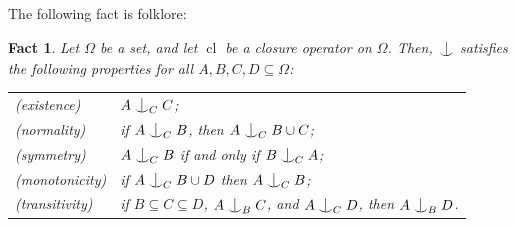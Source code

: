 \documentclass{article}
\newtheorem{lemma}[theorem]{Lemma}
\newtheorem{fact}[theorem]{Fact}
\theoremstyle{remark}
\newtheorem{notation}[theorem]{Notation}
\theoremstyle{definition}
\newtheorem{definition}[theorem]{Definition}
\def\acts{\curvearrowright}
\newcommand{\remmic}[1]{\textcolor{orange}{MP: #1}}
\newcommand{\indep}[2]{%
  \mathrel{
    \mathop{
      \vcenter{
        \hbox{\oalign{\noalign{\kern-.3ex}\hfil$\vert$\rlap{$^\mathrm{#2}$}\hfil\cr
              \noalign{\kern-.7ex}
              $\smile$\cr\noalign{\kern-.3ex}}}
      }
    }\displaylimits_{#1}
  }
}
\DeclareMathOperator{\cl}{cl}
\DeclareMathOperator{\acl}{acl}
\newcommand{\fps}[1]{[#1]^{<\omega}}
\def\Ind#1#2{#1\setbox0=\hbox{$#1x$}\kern\wd0\hbox to 0pt{\hss$#1\mid$\hss}
	\lower.9\ht0\hbox to 0pt{\hss$#1\smile$\hss}\kern\wd0}
\def\ind{\mathop{\mathpalette\Ind{}}}
\begin{document}
{{%



{The following fact is folklore:}

\begin{fact}\label{fact:axioms} 
{Let $\Omega$ be a set, and let $\cl$ be a closure operator on $\Omega$. Then, $\ind$ satisfies the following properties for all $A,B,C,D\subseteq \Omega$:}

\begin{tabular}{ll}
  {\sc(existence)} &   $A\indep{C}{} C$;\\
  {\sc(normality)} & if $A\indep{C}{} B$, then $A\indep{C}{} B\cup C$;\\
  {\sc(symmetry)}&   $A\indep{C}{}B$ if and only if $B\indep{C}{}A$;\\
   {\sc(monotonicity)} &  if $A\indep{C}{} B\cup D$ then $A\indep{C}{} B$;\\
   {\sc(transitivity)} & {if $B\subseteq C\subseteq D$, $A\indep{B}{} C$,  and $A\indep{C}{} D$, then $A\indep{B}{} D$.}
\end{tabular}


\end{fact}}}
\end{document}
